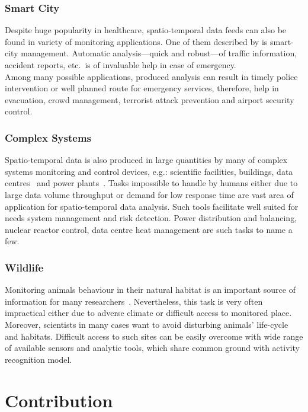 \documentclass[12pt, a4paper, pdflatex, leqno, twoside, openright]{report}
\begin{document}
      \subsubsection{Smart City}
Despite huge popularity in healthcare, spatio-temporal data feeds can also be found in variety of monitoring applications. One of them described by \citet{filipponi2010smart} is smart-city management. Automatic analysis---quick and robust---of traffic information, accident reports, etc.\ is of invaluable help in case of emergency.\\
Among many possible applications, produced analysis can result in timely police intervention or well planned route for emergency services, therefore, help in evacuation, crowd management, terrorist attack prevention and airport security control.

      \subsubsection{Complex Systems}
Spatio-temporal data is also produced in large quantities by many of complex systems monitoring and control devices, e.g.: scientific facilities, buildings, data centres~\citep{moore2005data} and power plants~\citep{amin2005toward}. 
Tasks impossible to handle by humans either due to large data volume throughput or demand for low response time are vast area of application for spatio-temporal data analysis. Such tools facilitate well suited for needs system management and risk detection. Power distribution and balancing, nuclear reactor control, data centre heat management are such tasks to name a few.

      \subsubsection{Wildlife}
Monitoring animals behaviour in their natural habitat is an important source of information for many researchers~\citep{Szewczyk:2004:HMS:990680.990704}. Nevertheless, this task is very often impractical either due to adverse climate or difficult access to monitored place. Moreover, scientists in many cases want to avoid disturbing animals' life-cycle and habitats. Difficult access to such sites can be easily overcome with wide range of available sensors and analytic tools, which share common ground with activity recognition model.


  \section{Contribution}
\end{document}
